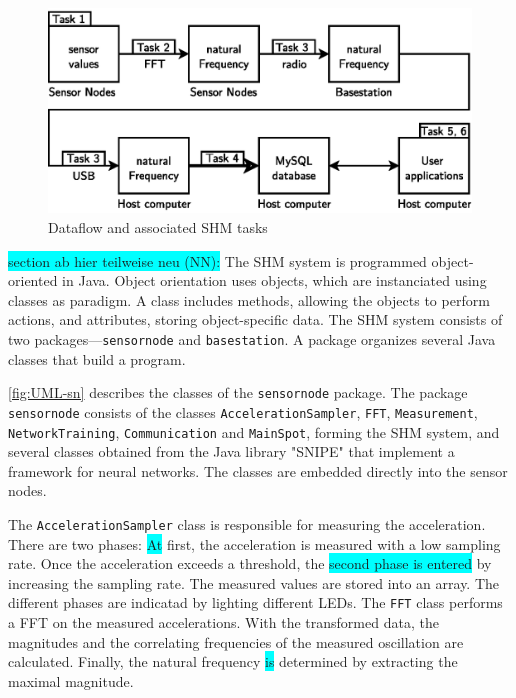 \documentclass[12pt,a4paper]{scrartcl}
\begin{document}
\begin{figure}[htb]
    \centering
    \includegraphics{figures/dataflow_tasks.eps}
    \caption{Dataflow and associated SHM tasks}
    \label{fig:flow}
\end{figure}

\colorbox{cyan}{section ab hier teilweise neu (NN):}
The SHM system is programmed object-oriented in Java. 
Object orientation uses objects, which are instanciated using classes as paradigm. 
A class includes methods, allowing the objects to perform actions, and attributes, storing object-specific data.
The SHM system consists of two packages---\texttt{sensornode} and \texttt{basestation}.
A package organizes several Java classes that build a program.

\autoref{fig:UML-sn} describes the classes of the \texttt{sensor\-node} package.
The package \texttt{sensor\-node} consists of the classes \texttt{Acceleration\-Sampler}, \texttt{FFT}, \texttt{Measure\-ment}, \texttt{Network\-Training}, \texttt{Communi\-cation} and \texttt{Main\-Spot}, forming the SHM system, and several classes obtained from the Java library "SNIPE"  that implement a framework for neural networks.
The classes are embedded directly into the sensor nodes.

The \texttt{Acceleration\-Sampler} class is responsible for measuring the acceleration.
There are two phases: \colorbox{cyan}{At} first, the acceleration is measured with a low sampling rate.
Once the acceleration exceeds a threshold, the \colorbox{cyan}{second phase is entered} by increasing the sampling rate. 
The measured values are stored into an array.
The different phases are indicatad by lighting different LEDs.
The \texttt{FFT} class performs a FFT on the measured accelerations. 
With the transformed data, the magnitudes and the correlating frequencies of the measured oscillation are calculated.
Finally, the natural frequency \colorbox{cyan}{is} determined by extracting the maximal magnitude.
\end{document}
